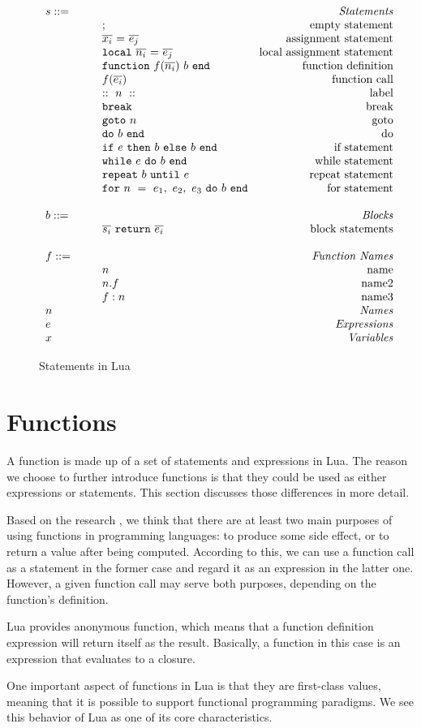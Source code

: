 \begin{figure}
\caption{Statements in Lua}
\label{fig:LuaStat}
\[
\begin{array}{llr}
  \mydefhead{s ::=\qquad\qquad\qquad\qquad}{Statements}
  \mydefcase{;}{empty statement}
  \mydefcase{\assign x e}{assignment statement}
  \mydefcase{\local n e}{local assignment statement}
  \mydefcase{\function f n b}{function definition}
  \mydefcase{f(\overline{e_i})}{function call}
  \mydefcase{::~n~::}{label}
  \mydefcase{\tt break}{break}
  \mydefcase{{\tt goto} ~n}{goto}
  \mydefcase{\doe b}{do}
  \mydefcase{\ife e b b}{if statement}
  \mydefcase{\whilee e b}{while statement}
  \mydefcase{\repeate e b}{repeat statement}
  \mydefcase{\for n e b}{for statement}
  \\
  \mydefhead{b ::=\qquad\qquad\qquad\qquad}{Blocks}
  \mydefcase{\overline{s_i}~{\tt return}~\overline{e_i}}{block statements}
  \\
  \mydefhead{f ::=\qquad\qquad\qquad\qquad}{Function Names}
  \mydefcase{n}{name}
  \mydefcase{n.f}{name2}
  \mydefcase{f:n}{name3}
  \mydefhead{n \qquad\qquad\qquad\qquad}{Names}
  \mydefhead{e \qquad\qquad\qquad\qquad}{Expressions}
  \mydefhead{x \qquad\qquad\qquad\qquad}{Variables}
\end{array}
\]
\end{figure}

\section{Functions}
A function is made up of a set of statements and expressions in Lua. The reason we choose to further introduce functions is that they could be used as either expressions or statements.
This section discusses those differences in more detail.

Based on the research \cite{PIL}, we think that there are at least two main purposes of using functions in programming languages: to produce some side effect, or to return a value after being computed. According to this, we can use a function call as a statement in the former case and regard it as an expression in the latter one. However, a given function call may serve both purposes, depending on the function's definition.

Lua provides anonymous function, which means that a function definition expression will return itself as the result. Basically, a function in this case is an expression that evaluates to a closure.

One important aspect of functions in Lua is that they are first-class values,
meaning that it is possible to support functional programming paradigms.
We see this behavior of Lua as one of its core characteristics.

